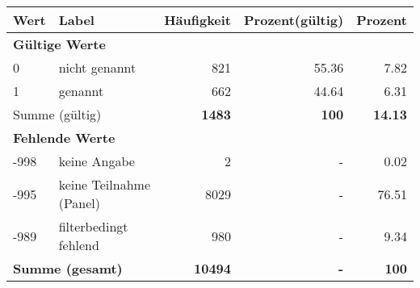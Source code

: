     \begin{longtable}{lXrrr}
     \toprule
     \textbf{Wert} & \textbf{Label} & \textbf{Häufigkeit} & \textbf{Prozent(gültig)} & \textbf{Prozent} \\
     \endhead
     \midrule
     \multicolumn{5}{l}{\textbf{Gültige Werte}}\\

     0 &
     \multicolumn{1}{X}{ nicht genannt   } &


       \num{821} &
       \num[round-mode=places,round-precision=2]{55,36} &
         \num[round-mode=places,round-precision=2]{7,82} \\

     1 &
     \multicolumn{1}{X}{ genannt   } &


       \num{662} &
       \num[round-mode=places,round-precision=2]{44,64} &
         \num[round-mode=places,round-precision=2]{6,31} \\
     \midrule
     \multicolumn{2}{l}{Summe (gültig)} &
       \textbf{\num{1483}} &
     \textbf{100} &
       \textbf{\num[round-mode=places,round-precision=2]{14,13}} \\
     \multicolumn{5}{l}{\textbf{Fehlende Werte}}\\
       -998 &
       keine Angabe &
         \num{2} &
        - &
         \num[round-mode=places,round-precision=2]{0,02} \\
       -995 &
       keine Teilnahme (Panel) &
         \num{8029} &
        - &
         \num[round-mode=places,round-precision=2]{76,51} \\
       -989 &
       filterbedingt fehlend &
         \num{980} &
        - &
         \num[round-mode=places,round-precision=2]{9,34} \\
     \midrule
     \multicolumn{2}{l}{\textbf{Summe (gesamt)}} &
          \textbf{\num{10494}} &
        \textbf{-} &
        \textbf{100} \\
     \bottomrule
     \end{longtable}
     
